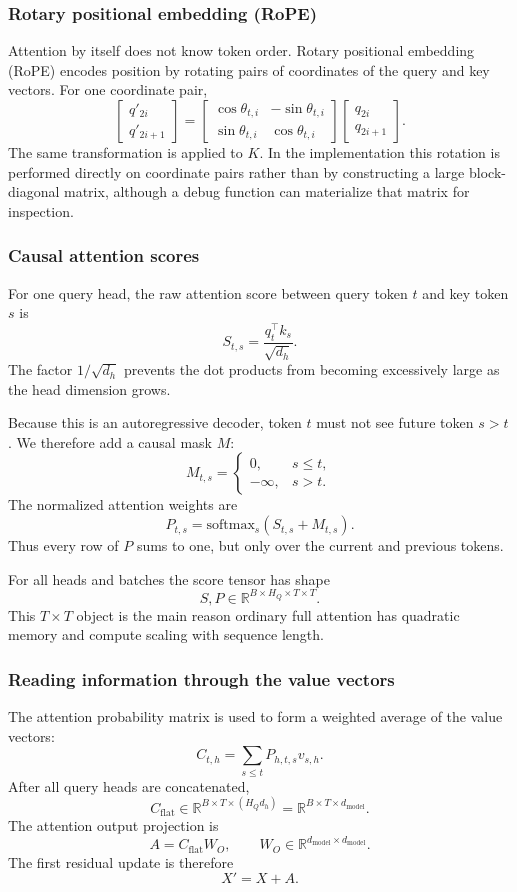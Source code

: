 \documentclass[11pt]{article}
\begin{document}
\subsubsection{Rotary positional embedding (RoPE)}
Attention by itself does not know token order. Rotary positional embedding (RoPE)
encodes position by rotating pairs of coordinates of the query and key vectors.
For one coordinate pair,
\[
\begin{bmatrix}q'_{2i}\\q'_{2i+1}\end{bmatrix}
=
\begin{bmatrix}
\cos\theta_{t,i} & -\sin\theta_{t,i}\\
\sin\theta_{t,i} & \cos\theta_{t,i}
\end{bmatrix}
\begin{bmatrix}q_{2i}\\q_{2i+1}\end{bmatrix}.
\]
The same transformation is applied to $K$.  In the implementation this rotation
is performed directly on coordinate pairs rather than by constructing a large
block-diagonal matrix, although a debug function can materialize that matrix for
inspection.

\subsubsection{Causal attention scores}
For one query head, the raw attention score between query token $t$ and key token
$s$ is
\[
S_{t,s}=\frac{q_t^\top k_s}{\sqrt{d_h}}.
\]
The factor $1/\sqrt{d_h}$ prevents the dot products from becoming excessively
large as the head dimension grows.

Because this is an autoregressive decoder, token $t$ must not see future token
$s>t$. We therefore add a causal mask $M$:
\[
M_{t,s}=\begin{cases}
0, & s\le t,\\
-\infty, & s>t.
\end{cases}
\]
The normalized attention weights are
\[
P_{t,s}=\mathrm{softmax}_s(S_{t,s}+M_{t,s}).
\]
Thus every row of $P$ sums to one, but only over the current and previous tokens.

For all heads and batches the score tensor has shape
\[
S,P\in\mathbb{R}^{B\times H_Q\times T\times T}.
\]
This $T\times T$ object is the main reason ordinary full attention has quadratic
memory and compute scaling with sequence length.

\subsubsection{Reading information through the value vectors}
The attention probability matrix is used to form a weighted average of the value
vectors:
\[
C_{t,h}=\sum_{s\le t}P_{h,t,s}v_{s,h}.
\]
After all query heads are concatenated,
\[
C_{\mathrm{flat}}\in\mathbb{R}^{B\times T\times(H_Qd_h)}
=
\mathbb{R}^{B\times T\times d_{\mathrm{model}}}.
\]
The attention output projection is
\[
A=C_{\mathrm{flat}}W_O,
\qquad
W_O\in\mathbb{R}^{d_{\mathrm{model}}\times d_{\mathrm{model}}}.
\]
The first residual update is therefore
\[
X'=X+A.
\]
\end{document}
